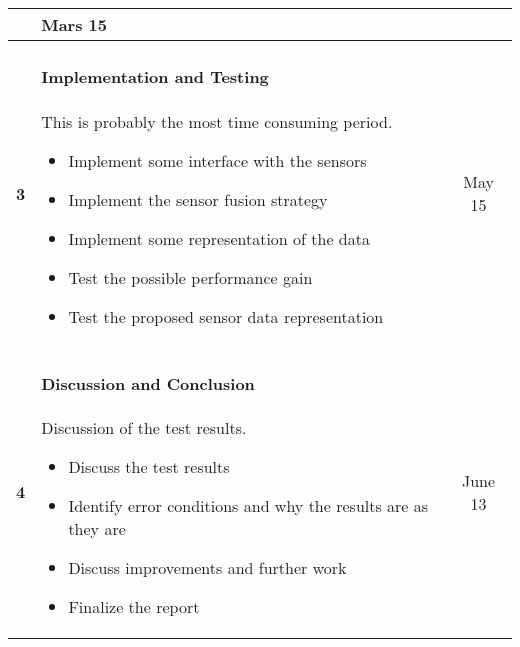 \documentclass[a4paper, 10pt]{article}
\begin{document}
\begin{tabular}{| c | p{11.5cm} || c |}
                                                       & Mars 15 \\
        \hline
        \textbf{3}  &   \paragraph{Implementation and Testing} This is probably the most
                        time consuming period.
                        \begin{itemize}
                            \item Implement some interface with the sensors
                            \item Implement the sensor fusion strategy
                            \item Implement some representation of the data
                            \item Test the possible performance gain
                            \item Test the proposed sensor data representation
                        \end{itemize}
                                                       & May 15 \\
        \hline
        \textbf{4}  &   \paragraph{Discussion and Conclusion} Discussion of the test
                        results. 
                        \begin{itemize}
                            \item Discuss the test results
                            \item Identify error conditions and why the results are as
                                they are
                            \item Discuss improvements and further work
                            \item Finalize the report
                        \end{itemize}
                                                       & June 13 \\

    \hline
\end{tabular}
\end{document}
